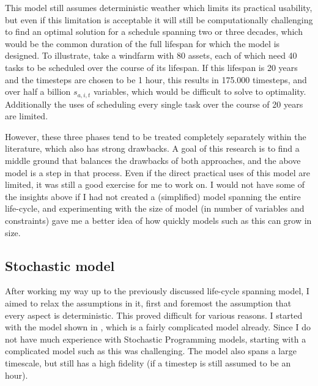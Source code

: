 \documentclass[a4paper,12pt]{article}
\begin{document}
This model still assumes deterministic weather which limits its practical usability, but even if this limitation is acceptable it will still be computationally challenging to find an optimal solution for a schedule spanning two or three decades, which would be the common duration of the full lifespan for which the model is designed. To illustrate, take a windfarm with 80 assets, each of which need 40 tasks to be scheduled over the course of its lifespan. If this lifespan is 20 years and the timesteps are chosen to be 1 hour, this results in 175.000 timesteps, and over half a billion $s_{a,i,t}$ variables, which would be difficult to solve to optimality. Additionally the uses of scheduling every single task over the course of 20 years are limited. 

However, these three phases tend to be treated completely separately within the literature, which also has strong drawbacks. A goal of this research is to find a middle ground that balances the drawbacks of both approaches, and the above model is a step in that process. Even if the direct practical uses of this model are limited, it was still a good exercise for me to work on. I would not have some of the insights above if I had not created a (simplified) model spanning the entire life-cycle, and experimenting with the size of model (in number of variables and constraints) gave me a better idea of how quickly models such as this can grow in size. 

\subsection{Stochastic model} \label{ss:stoc}
After working my way up to the previously discussed life-cycle spanning model, I aimed to relax the assumptions in it, first and foremost the assumption that every aspect is deterministic. This proved difficult for various reasons. I started with the model shown in , which is a fairly complicated model already. Since I do not have much experience with Stochastic Programming models, starting with a complicated model such as this was challenging. The model also spans a large timescale, but still has a high fidelity (if a timestep is still assumed to be an hour). 
\end{document}
